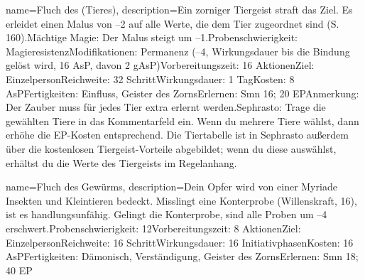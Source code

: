 {
    name={Fluch des (Tieres)},
    description={Ein zorniger Tiergeist straft das Ziel. Es erleidet einen Malus von –2 auf alle Werte, die dem Tier zugeordnet sind (S. 160).\newline Mächtige Magie: Der Malus steigt um –1.\newline Probenschwierigkeit: Magieresistenz\newline Modifikationen: Permanenz (–4, Wirkungsdauer bis die Bindung gelöst wird, 16 AsP, davon 2 gAsP)\newline Vorbereitungszeit: 16 Aktionen\newline Ziel: Einzelperson\newline Reichweite: 32 Schritt\newline Wirkungsdauer: 1 Tag\newline Kosten: 8 AsP\newline Fertigkeiten: Einfluss, Geister des Zorns\newline Erlernen: Smn 16; 20 EP\newline Anmerkung: Der Zauber muss für jedes Tier extra erlernt werden.\newline Sephrasto: Trage die gewählten Tiere in das Kommentarfeld ein. Wenn du mehrere Tiere wählst, dann erhöhe die EP-Kosten entsprechend. Die Tiertabelle ist in Sephrasto außerdem über die kostenlosen Tiergeist-Vorteile abgebildet; wenn du diese auswählst, erhältst du die Werte des Tiergeists im Regelanhang.}
}


{
    name={Fluch des Gewürms},
    description={Dein Opfer wird von einer Myriade Insekten und Kleintieren bedeckt. Misslingt eine Konterprobe (Willenskraft, 16), ist es handlungsunfähig. Gelingt die Konterprobe, sind alle Proben um –4 erschwert.\newline Probenschwierigkeit: 12\newline Vorbereitungszeit: 8 Aktionen\newline Ziel: Einzelperson\newline Reichweite: 16 Schritt\newline Wirkungsdauer: 16 Initiativphasen\newline Kosten: 16 AsP\newline Fertigkeiten: Dämonisch, Verständigung, Geister des Zorns\newline Erlernen: Smn 18; 40 EP}
}


